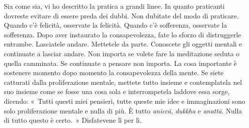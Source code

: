 Sia come sia, vi ho descritto la pratica a grandi linee. In quanto
praticanti dovreste evitare di essere preda dei dubbi. Non dubitate del
modo di praticare. Quando c'è felicità, osservate la felicità. Quando
c'è sofferenza, osservate la sofferenza. Dopo aver instaurato la
consapevolezza, fate lo sforzo di distruggerle entrambe. Lasciatele
andare. Mettetele da parte. Conoscete gli oggetti mentali e continuate a
lasciar andare. Non importa se volete fare la meditazione seduta o
quella camminata. Se continuate a pensare non importa. La cosa
importante è sostenere momento dopo momento la consapevolezza della
mente. Se siete catturati dalla proliferazione mentale, mettete tutto
insieme e contemplatela nel suo insieme come se fosse una cosa sola e
interrompetela laddove essa sorge, dicendo: «~Tutti questi miei
pensieri, tutte queste mie idee e immaginazioni sono solo proliferazione
mentale e nulla di più. È tutto \emph{aniccā}, \emph{dukkha} e
\emph{anattā}. Nulla di tutto questo è certo.~» Disfatevene lì per lì.

